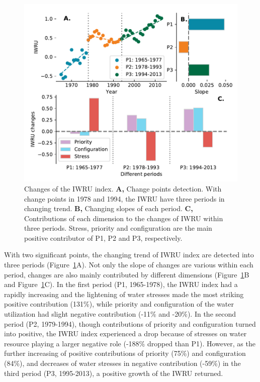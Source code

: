 \documentclass[9pt, twocolumn, twoside, lineno]{pnas-new}
\begin{document}
\begin{figure}[ht!]
	\centering
	\includegraphics[width=\linewidth]{../../figures/main/index.pdf}
	\caption{Changes of the IWRU index. 
	\textbf{A,} Change points detection. With change points in 1978 and 1994, the IWRU have three periods in changing trend.
	\textbf{B,} Changing slopes of each period.
	\textbf{C,} Contributions of each dimension to the changes of IWRU within three periods. Stress, priority and configuration are the main positive contributor of P1, P2 and P3, respectively.
	}
	\label{fig:IWRU}
\end{figure}

With two significant points, the changing trend of IWRU index are detected into three periods (Figure~\ref{fig:IWRU}A). 
Not only the slope of changes are various within each period, changes are also mainly contributed by different dimensions (Figure~\ref{fig:IWRU}B and Figure~\ref{fig:IWRU}C).
In the first period (P1, 1965-1978), the IWRU index had a rapidly increasing and the lightening of water stresses made the most striking positive contribution (131\%), while priority and configuration of the water utilization had slight negative contribution (-11\% and -20\%).
In the second period (P2, 1979-1994), though contributions of priority and configuration turned into positive, the IWRU index experienced a drop because of stresses on water resource playing a larger negative role (-188\% dropped than P1). 
However, as the further increasing of positive contributions of priority (75\%) and configuration (84\%), and decreases of water stresses in negative contribution (-59\%) in the third period (P3, 1995-2013), a positive growth of the IWRU returned.
\end{document}
